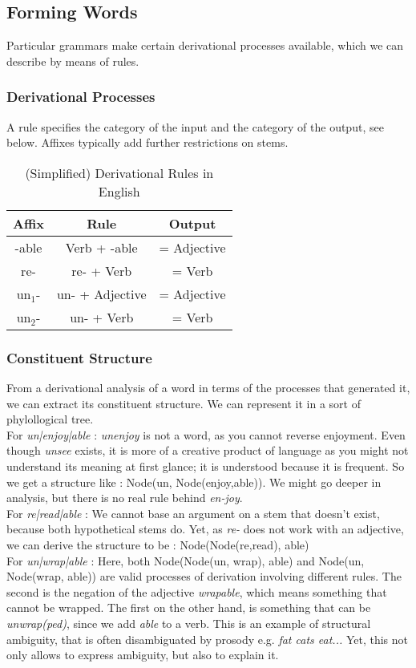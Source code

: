 \documentclass{cours}
\begin{document}
\subsection{Forming Words}
Particular grammars make certain derivational processes available, which we can describe by means of rules.

\subsubsection{Derivational Processes}
A rule specifies the category of the input and the category of the output, see below. Affixes typically add further restrictions on stems.

\begin{table}
    \centering
    \caption{(Simplified) Derivational Rules in English}
    \begin{tabular}{ccc}
        \toprule
        Affix &Rule &Output\\
        \midrule
        -able & Verb + -able &= Adjective\\
        re- & re- + Verb &= Verb\\
        un$_{1}$- & un- + Adjective &= Adjective\\
        un$_{2}$- & un- + Verb &= Verb\\
    \end{tabular}
\end{table}

\subsubsection{Constituent Structure}
From a derivational analysis of a word in terms of the processes that generated it, we can extract its constituent structure. We can represent it in a sort of phylollogical tree. \\
For \textsl{un|enjoy|able}\! : \textsl{unenjoy} is not a word, as you cannot reverse enjoyment. Even though \textsl{unsee} exists, it is more of a creative product of language as you might not understand its meaning at first glance; it is understood because it is frequent. So we get a structure like\! : Node(un, Node(enjoy,able)). We might go deeper in analysis, but there is no real rule behind \textsl{en-joy}.\\
For \textsl{re|read|able}\! : We cannot base an argument on a stem that doesn't exist, because both hypothetical stems do. Yet, as \textsl{re-} does not work with an adjective, we can derive the structure to be\! : Node(Node(re,read), able)\\
For \textsl{un|wrap|able}\! : Here, both Node(Node(un, wrap), able) and Node(un, Node(wrap, able)) are valid processes of derivation involving different rules. The second is the negation of the adjective \textsl{wrapable}, which means something that cannot be wrapped. The first on the other hand, is something that can be \textsl{unwrap(ped)}, since we add \textsl{able} to a verb. This is an example of structural ambiguity, that is often disambiguated by prosody e.g. \textsl{fat cats eat...} Yet, this not only allows to express ambiguity, but also to explain it. 
\end{document}
